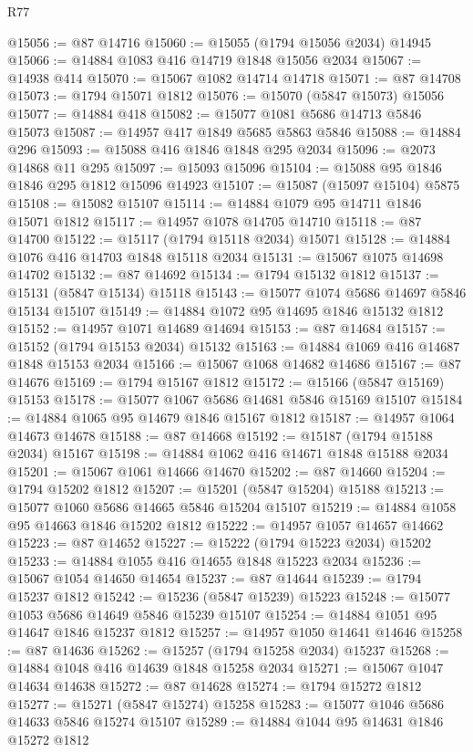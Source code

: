 \begin{lexlean}{R77}
\begin{coremodule}
@15056 := @87 @14716
@15060 := @15055 (@1794 @15056 @2034) @14945
@15066 := @14884 @1083 @416 @14719 @1848 @15056 @2034
@15067 := @14938 @414
@15070 := @15067 @1082 @14714 @14718
@15071 := @87 @14708
@15073 := @1794 @15071 @1812
@15076 := @15070 (@5847 @15073) @15056
@15077 := @14884 @418
@15082 := @15077 @1081 @5686 @14713 @5846 @15073
@15087 := @14957 @417 @1849 @5685 @5863 @5846
@15088 := @14884 @296
@15093 := @15088 @416 @1846 @1848 @295 @2034
@15096 := @2073 @14868 @11 @295
@15097 := @15093 @15096
@15104 := @15088 @95 @1846 @1846 @295 @1812 @15096 @14923
@15107 := @15087 (@15097 @15104) @5875
@15108 := @15082 @15107
@15114 := @14884 @1079 @95 @14711 @1846 @15071 @1812
@15117 := @14957 @1078 @14705 @14710
@15118 := @87 @14700
@15122 := @15117 (@1794 @15118 @2034) @15071
@15128 := @14884 @1076 @416 @14703 @1848 @15118 @2034
@15131 := @15067 @1075 @14698 @14702
@15132 := @87 @14692
@15134 := @1794 @15132 @1812
@15137 := @15131 (@5847 @15134) @15118
@15143 := @15077 @1074 @5686 @14697 @5846 @15134 @15107
@15149 := @14884 @1072 @95 @14695 @1846 @15132 @1812
@15152 := @14957 @1071 @14689 @14694
@15153 := @87 @14684
@15157 := @15152 (@1794 @15153 @2034) @15132
@15163 := @14884 @1069 @416 @14687 @1848 @15153 @2034
@15166 := @15067 @1068 @14682 @14686
@15167 := @87 @14676
@15169 := @1794 @15167 @1812
@15172 := @15166 (@5847 @15169) @15153
@15178 := @15077 @1067 @5686 @14681 @5846 @15169 @15107
@15184 := @14884 @1065 @95 @14679 @1846 @15167 @1812
@15187 := @14957 @1064 @14673 @14678
@15188 := @87 @14668
@15192 := @15187 (@1794 @15188 @2034) @15167
@15198 := @14884 @1062 @416 @14671 @1848 @15188 @2034
@15201 := @15067 @1061 @14666 @14670
@15202 := @87 @14660
@15204 := @1794 @15202 @1812
@15207 := @15201 (@5847 @15204) @15188
@15213 := @15077 @1060 @5686 @14665 @5846 @15204 @15107
@15219 := @14884 @1058 @95 @14663 @1846 @15202 @1812
@15222 := @14957 @1057 @14657 @14662
@15223 := @87 @14652
@15227 := @15222 (@1794 @15223 @2034) @15202
@15233 := @14884 @1055 @416 @14655 @1848 @15223 @2034
@15236 := @15067 @1054 @14650 @14654
@15237 := @87 @14644
@15239 := @1794 @15237 @1812
@15242 := @15236 (@5847 @15239) @15223
@15248 := @15077 @1053 @5686 @14649 @5846 @15239 @15107
@15254 := @14884 @1051 @95 @14647 @1846 @15237 @1812
@15257 := @14957 @1050 @14641 @14646
@15258 := @87 @14636
@15262 := @15257 (@1794 @15258 @2034) @15237
@15268 := @14884 @1048 @416 @14639 @1848 @15258 @2034
@15271 := @15067 @1047 @14634 @14638
@15272 := @87 @14628
@15274 := @1794 @15272 @1812
@15277 := @15271 (@5847 @15274) @15258
@15283 := @15077 @1046 @5686 @14633 @5846 @15274 @15107
@15289 := @14884 @1044 @95 @14631 @1846 @15272 @1812

\end{coremodule}
\end{lexlean}
